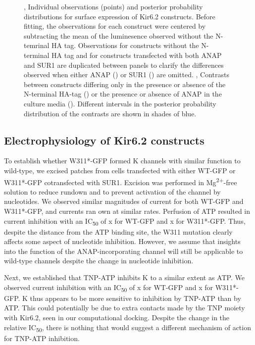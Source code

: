 \begin{figure}[h]
\begin{subfigure}[t]{0.45\textwidth}
	\end{subfigure}
	\caption[ANAP construct surface expression assay]{
	,  Individual observations (points) and posterior probability distributions for surface expression of Kir6.2 constructs.
	Before fitting, the observations for each construct were centered by subtracting the mean of the luminesence observed without the N-temrinal HA tag.
	Observations for constructs without the N-terminal HA tag and for constructs transfected with both ANAP and SUR1 are duplicated between panels to clarify the differences observed when either ANAP () or SUR1 () are omitted.
	,  Contrasts between constructs differing only in the presence or absence of the N-terminal HA-tag () or the presence or absence of ANAP in the culture media ().
	Different intervals in the posterior probability distribution of the contrasts are shown in shades of blue.
	}
\end{figure}

\subsection{Electrophysiology of Kir6.2 constructs}

To establish whether W311*-GFP formed K\ATP{} channels with similar function to wild-type, we excised patches from cells transfected with either WT-GFP or W311*-GFP cotransfected with SUR1.
Excision was performed in Mg\textsuperscript{2+}-free solution to reduce rundown and to prevent activation of the channel by nucleotides.
We observed similar magnitudes of current for both WT-GFP and W311*-GFP, and currents ran own at similar rates.
Perfusion of ATP resulted in current inhibition with an IC\textsubscript{50} of x for WT-GFP and x for W311*-GFP.
Thus, despite the distance from the ATP binding site, the W311 mutation clearly affects some aspect of nucleotide inhibition.
However, we assume that insights into the function of the ANAP-incorporating channel will still be applicable to wild-type channels despite the change in nucleotide inhibition.

Next, we established that TNP-ATP inhibits K\ATP{} to a similar extent as ATP.
We observed current inhibition with an IC\textsubscript{50} of x for WT-GFP and x for W311*-GFP.
K\ATP{} thus appears to be more sensitive to inhibition by TNP-ATP than by ATP.
This could potentially be due to extra contacts made by the TNP moiety with Kir6.2, seen in our computational docking.
Despite the change in the relative IC\textsubscript{50}, there is nothing that would suggest a different mechanism of action for TNP-ATP inhibition.

